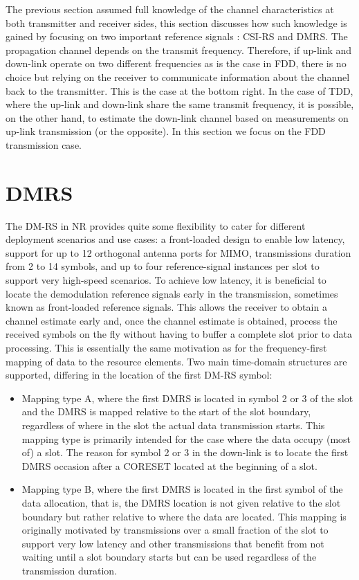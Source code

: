 The previous section assumed full knowledge of the channel characteristics at both transmitter and receiver sides, this section discusses how such knowledge is gained by focusing on two important reference signals : CSI-RS and DMRS.
\newline
The propagation channel depends on the transmit frequency. Therefore, if up-link and down-link operate on two different frequencies as is the case in FDD, there is no choice but relying on the receiver to communicate information about the channel back to the transmitter. This is the case at the bottom right.
\newline
In the case of TDD, where the up-link and down-link share the same transmit frequency, it is possible, on the other hand, to estimate the down-link channel based on measurements on up-link transmission (or the opposite). In this section we focus on the FDD transmission case.

\section{DMRS}
The DM-RS in NR provides quite some flexibility to cater for different deployment scenarios and use cases: a front-loaded design to enable low latency, support for up to 12 orthogonal antenna ports for MIMO, transmissions duration from 2 to 14 symbols, and up to four reference-signal instances per slot to support very high-speed scenarios.
To achieve low latency, it is beneficial to locate the demodulation reference signals early in the transmission, sometimes known as front-loaded reference signals. This allows the receiver to obtain a channel estimate early and, once the channel estimate is obtained, process the received symbols on the fly without having to buffer a complete slot prior to data processing. This is essentially the same motivation as for the frequency-first mapping of data to the resource elements.
Two main time-domain structures are supported, differing in the location of the first DM-RS symbol:
\begin{itemize}
    \item Mapping type A, where the first DMRS is located in symbol 2 or 3 of the slot and the DMRS is mapped relative to the start of the slot boundary, regardless of where in the slot the actual data transmission starts. This mapping type is primarily intended for the case where the data occupy (most of) a slot. The reason for symbol 2 or 3 in the down-link is to locate the first DMRS occasion after a CORESET located at the beginning of a slot.
    \item Mapping type B, where the first DMRS is located in the first symbol of the data allocation, that is, the DMRS location is not given relative to the slot boundary but rather relative to where the data are located. This mapping is originally motivated by transmissions over a small fraction of the slot to support very low latency and other transmissions that benefit from not waiting until a slot boundary starts but can be used regardless of the transmission duration.
\end{itemize}

